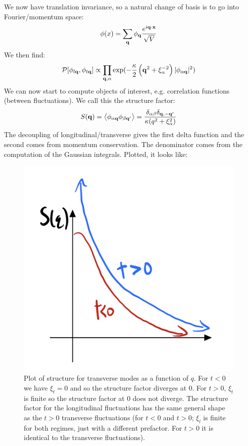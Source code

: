 We now have translation invariance, so a natural change of basis is to go into Fourier/momentum space:
\begin{equation}
    \phi(x) = \sum_{\mathbf{q}} \phi_{\mathbf{q}} \frac{e^{i\mathbf{q} \cdot \mathbf{x}}}{\sqrt{V}}
\end{equation}
We then find:
\begin{equation}
    \mathcal{P}[\phi_{l\mathbf{q}}, \phi_{t\mathbf{q}}] \propto \prod_{\mathbf{q}, \alpha}\exp(-\frac{\kappa}{2}\left(\mathbf{q}^2 + \xi_\alpha^{-2}\right)\lvert \phi_{\alpha\mathbf{q}} \rvert^2)
\end{equation}
We can now start to compute objects of interest, e.g. correlation functions (between fluctuations). We call this the structure factor:
\begin{equation}\label{eq:structurefactor}
    S(\mathbf{q}) = \left< \phi_{\alpha\mathbf{q}}\phi_{\beta\mathbf{q}'} \right> = \frac{\delta_{\alpha\beta}\delta_{\mathbf{q},-\mathbf{q}'}}{\kappa(q^2 + \xi^2_\alpha)}
\end{equation}
The decoupling of longitudinal/transverse gives the first delta function and the second comes from momentum conservation. The denominator comes from the computation of the Gaussian integrals. Plotted, it looks like:

\begin{figure}[htbp]
    \centering
    \includegraphics[scale=0.3]{Lectures/Figures/structure_factor.png}
    \caption{Plot of structure for transverse modes as a function of $q$. For $t < 0$ we have $\xi_t = 0$ and so the structure factor diverges at $0$. For $t > 0$, $\xi_t$ is finite so the structure factor at $0$ does not diverge. The structure factor for the longitudinal fluctuations has the same general shape as the $t > 0$ transverse fluctuations (for $t < 0$ and $t > 0$; $\xi_l$ is finite for both regimes, just with a different prefactor. For $t > 0$ it is identical to the transverse fluctuations).}
    \label{fig:structure_factors}
\end{figure}

